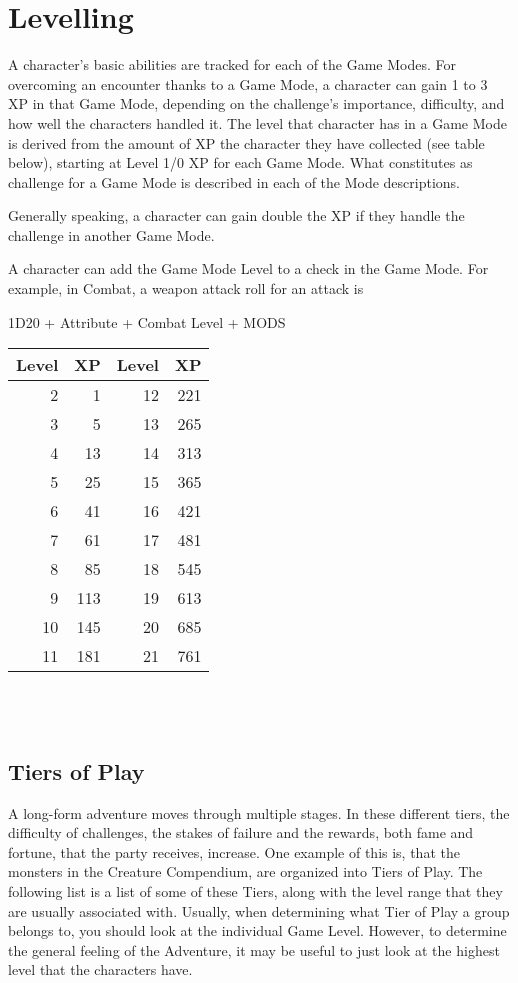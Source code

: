 \section{Levelling}\label{sec:levelling}
A character’s basic abilities are tracked for each of the Game Modes.
For overcoming an encounter thanks to a Game Mode, a character can gain 1 to 3 XP in that Game Mode, depending on the challenge’s importance, difficulty, and how well the characters handled it.
The level that character has in a Game Mode is derived from the amount of XP the character they have collected (see table below), starting at Level 1/0 XP for each Game Mode.
What constitutes as challenge for a Game Mode is described in each of the Mode descriptions.

Generally speaking, a character can gain double the XP if they handle the challenge in another Game Mode.

A character can add the Game Mode Level to a check in the Game Mode.
For example, in Combat, a weapon attack roll for an attack is \\
\begin{center}
	
1D20 + Attribute + Combat Level + MODS\\

\begin{tabular}{r r | r r}
Level & XP & Level & XP\\ \hline
2 & 1 & 12 & 221\\
3 & 5 & 13 & 265\\
4 & 13 & 14 & 313\\
5 & 25 & 15 & 365\\
6 & 41 & 16 & 421\\
7 & 61 & 17 & 481\\
8 & 85 & 18 & 545\\
9 & 113 & 19 & 613\\
10 & 145 & 20 & 685\\
11 & 181 & 21 & 761\\
\end{tabular}\\~\\

\end{center}

\subsection{Tiers of Play}\label{subsec:tiersOfPlay}
A long-form adventure moves through multiple stages.
In these different tiers, the difficulty of challenges, the stakes of failure and the rewards, both fame and fortune, that the party receives, increase.
One example of this is, that the monsters in the Creature Compendium, are organized into Tiers of Play.
The following list is a list of some of these Tiers, along with the level range that they are usually associated with.
Usually, when determining what Tier of Play a group belongs to, you should look at the individual Game Level.
However, to determine the general feeling of the Adventure, it may be useful to just look at the highest level that the characters have.

